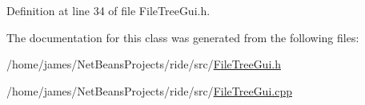 Definition at line 34 of file File\-Tree\-Gui.\-h.



The documentation for this class was generated from the following files\-:\begin{DoxyCompactItemize}
\item 
/home/james/\-Net\-Beans\-Projects/ride/src/\hyperlink{_file_tree_gui_8h}{File\-Tree\-Gui.\-h}\item 
/home/james/\-Net\-Beans\-Projects/ride/src/\hyperlink{_file_tree_gui_8cpp}{File\-Tree\-Gui.\-cpp}\end{DoxyCompactItemize}
